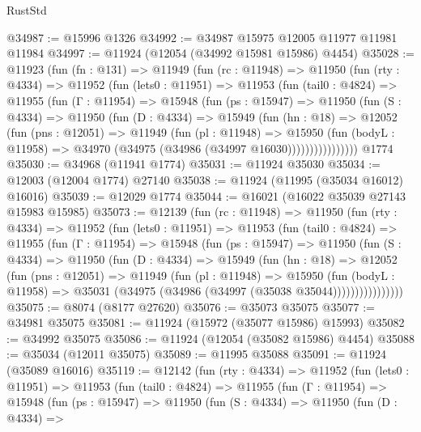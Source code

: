 \begin{lexlean}{RustStd}
\begin{coremodule}
@34987 := @15996 @1326
@34992 := @34987 @15975 @12005 @11977 @11981 @11984
@34997 := @11924 (@12054 (@34992 @15981 @15986) @4454)
@35028 := @11923
    (fun (fn : @131) =>
    @11949
      (fun (rc : @11948) =>
      @11950
        (fun (rty : @4334) =>
        @11952
          (fun (lets0 : @11951) =>
          @11953
            (fun (tail0 : @4824) =>
            @11955
              (fun (Γ : @11954) =>
              @15948
                (fun (ps : @15947) =>
                @11950
                  (fun (S : @4334) =>
                  @11950
                    (fun (D : @4334) =>
                    @15949
                      (fun (hn : @18) =>
                      @12052
                        (fun (pns : @12051) =>
                        @11949
                          (fun (pl : @11948) =>
                          @15950
                            (fun (bodyL : @11958) =>
                            @34970 (@34975 (@34986 (@34997 @16030))))))))))))))))
    @1774
@35030 := @34968 (@11941 @1774)
@35031 := @11924 @35030
@35034 := @12003 (@12004 @1774) @27140
@35038 := @11924 (@11995 (@35034 @16012) @16016)
@35039 := @12029 @1774
@35044 := @16021 (@16022 @35039 @27143 @15983 @15985)
@35073 := @12139
    (fun (rc : @11948) =>
    @11950
      (fun (rty : @4334) =>
      @11952
        (fun (lets0 : @11951) =>
        @11953
          (fun (tail0 : @4824) =>
          @11955
            (fun (Γ : @11954) =>
            @15948
              (fun (ps : @15947) =>
              @11950
                (fun (S : @4334) =>
                @11950
                  (fun (D : @4334) =>
                  @15949
                    (fun (hn : @18) =>
                    @12052
                      (fun (pns : @12051) =>
                      @11949
                        (fun (pl : @11948) =>
                        @15950
                          (fun (bodyL : @11958) =>
                          @35031 (@34975 (@34986 (@34997 (@35038 @35044))))))))))))))))
@35075 := @8074 (@8177 @27620)
@35076 := @35073 @35075
@35077 := @34981 @35075
@35081 := @11924 (@15972 (@35077 @15986) @15993)
@35082 := @34992 @35075
@35086 := @11924 (@12054 (@35082 @15986) @4454)
@35088 := @35034 (@12011 @35075)
@35089 := @11995 @35088
@35091 := @11924 (@35089 @16016)
@35119 := @12142
    (fun (rty : @4334) =>
    @11952
      (fun (lets0 : @11951) =>
      @11953
        (fun (tail0 : @4824) =>
        @11955
          (fun (Γ : @11954) =>
          @15948
            (fun (ps : @15947) =>
            @11950
              (fun (S : @4334) =>
              @11950
                (fun (D : @4334) =>

\end{coremodule}
\end{lexlean}

